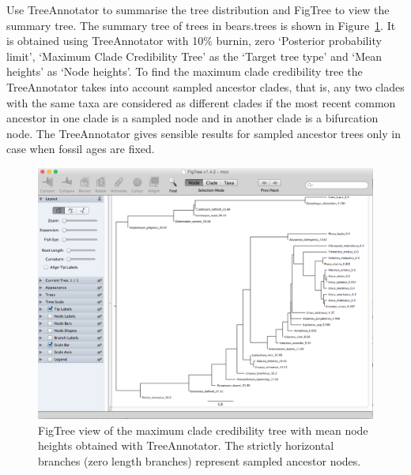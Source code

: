 \documentclass[12pt]{article}
\begin{document}
Use TreeAnnotator to summarise the tree distribution and FigTree to view the summary tree. The summary tree of trees in bears.trees is shown in Figure~\ref{fig:FigTree}. It is obtained using TreeAnnotator with 10\% burnin, zero `Posterior probability limit', `Maximum Clade Credibility Tree' as the `Target tree type' and `Mean heights' as `Node heights'. To find the maximum clade credibility tree the TreeAnnotator takes into account sampled ancestor clades, that is, any two clades with the same taxa are considered as different clades if the most recent common ancestor in one clade is a sampled node and in another clade is a bifurcation node. The TreeAnnotator gives sensible results for sampled ancestor trees only in case when fossil ages are fixed.  

\begin{figure}	
\centering
\includegraphics[width=\textwidth]{figures/FigTree}
\caption{FigTree view of the maximum clade credibility tree with mean node heights obtained with TreeAnnotator. The strictly horizontal branches (zero length branches) represent sampled ancestor nodes. \label{fig:FigTree}}
\end{figure}


%
\end{document}
